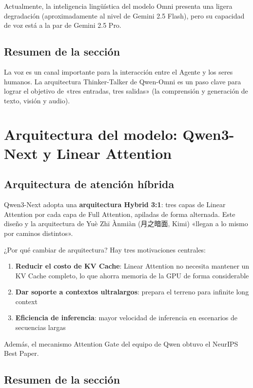 \documentclass[a4paper]{article}
\begin{document}
Actualmente, la inteligencia lingüística del modelo Omni presenta una ligera degradación (aproximadamente al nivel de Gemini 2.5 Flash), pero su capacidad de voz está a la par de Gemini 2.5 Pro.

\subsection{Resumen de la sección}

La voz es un canal importante para la interacción entre el Agente y los seres humanos. La arquitectura Thinker-Talker de Qwen-Omni es un paso clave para lograr el objetivo de «tres entradas, tres salidas» (la comprensión y generación de texto, visión y audio).
\section{Arquitectura del modelo: Qwen3-Next y Linear Attention}

\subsection{Arquitectura de atención híbrida}

Qwen3-Next adopta una \textbf{arquitectura Hybrid 3:1}: tres capas de Linear Attention por cada capa de Full Attention, apiladas de forma alternada. Este diseño y la arquitectura de Yuè Zhī Ànmiàn (月之暗面, Kimi) «llegan a lo mismo por caminos distintos».

\begin{importantbox}{¿Por qué cambiar de arquitectura?}
Hay tres motivaciones centrales:
\begin{enumerate}
    \item \textbf{Reducir el costo de KV Cache}: Linear Attention no necesita mantener un KV Cache completo, lo que ahorra memoria de la GPU de forma considerable
    \item \textbf{Dar soporte a contextos ultralargos}: prepara el terreno para infinite long context
    \item \textbf{Eficiencia de inferencia}: mayor velocidad de inferencia en escenarios de secuencias largas
\end{enumerate}
Además, el mecanismo Attention Gate del equipo de Qwen obtuvo el NeurIPS Best Paper.
\end{importantbox}

\subsection{Resumen de la sección}
\end{document}
